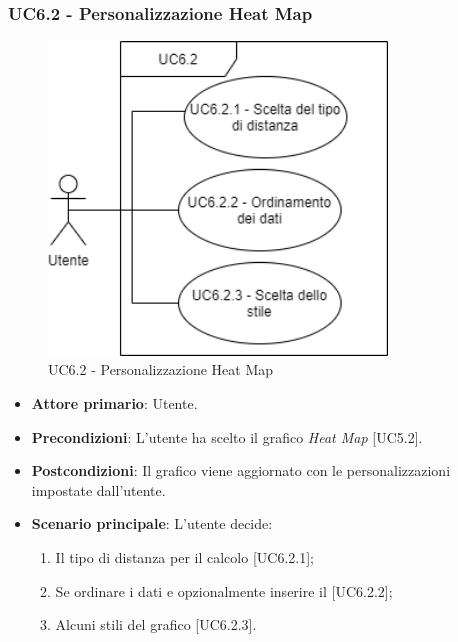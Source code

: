 \subsubsection{UC6.2 - Personalizzazione Heat Map}
\begin{figure}[h]
\includegraphics[width=9cm]{../Images/UC6.2.png}
\centering
\caption{UC6.2 - Personalizzazione Heat Map}
\end{figure}
\begin{itemize}
	\item \textbf{Attore primario}: Utente.
	
	\item \textbf{Precondizioni}: L'utente ha scelto il grafico \textit{Heat Map} [UC5.2].
	
	\item \textbf{Postcondizioni}: Il grafico viene aggiornato con le personalizzazioni impostate dall'utente.
	
	\item \textbf{Scenario principale}: L'utente decide:
	
\begin{enumerate}
\item Il tipo di distanza per il calcolo [UC6.2.1];
\item Se ordinare i dati e opzionalmente inserire il  [UC6.2.2];
\item Alcuni stili del grafico [UC6.2.3].
\end{enumerate}	
		
\end{itemize}
